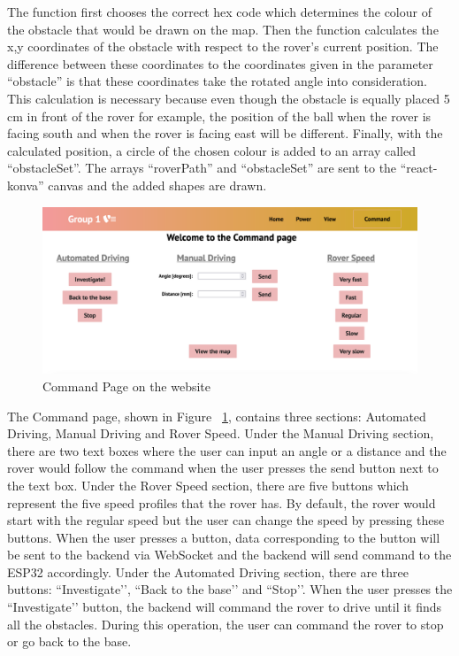 \documentclass[a4paper]{article}
\begin{document}
The function first chooses the correct hex code which determines the colour of the obstacle that would be drawn on the map. 
Then the function calculates the x,y coordinates of the obstacle with respect to the rover’s current position. The difference 
between these coordinates to the coordinates given in the parameter ``obstacle'' is that these coordinates take the rotated angle 
into consideration. This calculation is necessary because even though the obstacle is equally placed 5 cm in front of the rover 
for example, the position of the ball when the rover is facing south and when the rover is facing east will be different. 
Finally, with the calculated position, a circle of the chosen colour is added to an array called “obstacleSet”. The arrays 
``roverPath'' and ``obstacleSet'' are sent to the ``react-konva'' canvas and the added shapes are drawn. 

\begin{figure}[H]
	\begin{Center}
		\includegraphics[width = \linewidth]{./images/CommandPage.png}
		\caption{Command Page on the website}
        \label{fig:commandpage}
	\end{Center}
\end{figure}

The Command page, shown in Figure ~\ref{fig:commandpage}, contains three sections: Automated Driving, Manual Driving and Rover Speed. Under the Manual 
Driving section, there are two text boxes where the user can input an angle or a distance and the rover would follow the command 
when the user presses the send button next to the text box. Under the Rover Speed section, there are five buttons which represent 
the five speed profiles that the rover has. By default, the rover would start with the regular speed but the user can change the 
speed by pressing these buttons. When the user presses a button, data corresponding to the button will be sent to the backend via 
WebSocket and the backend will send command to the ESP32 accordingly. Under the Automated Driving section, there are three buttons: 
``Investigate’’, ``Back to the base’’ and ``Stop’’. When the user presses the ``Investigate’’ button, the backend will command the 
rover to drive until it finds all the obstacles. During this operation, the user can command the rover to stop or go back to the 
base. 
\end{document}
